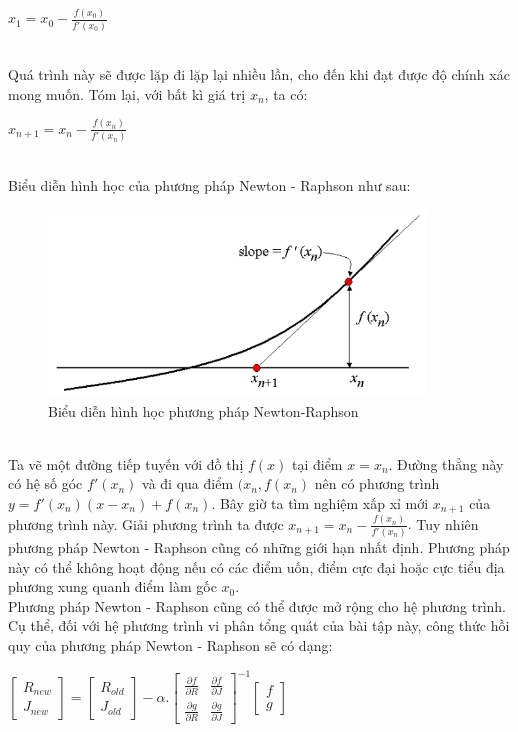 \centerline{$x_1 = x_0 - \frac{f(x_0)}{f'(x_0)}$}\\
\hspace*{0.5cm} {Quá trình này sẽ được lặp đi lặp lại nhiều lần, cho đến khi đạt được độ chính xác mong muốn. Tóm lại, với bất kì giá trị $x_n$, ta có:}\\
\centerline{$x_{n+1} = x_n - \frac{f(x_n)}{f'(x_n)}$}\\
\hspace*{0.5cm} {Biểu diễn hình học của phương pháp Newton - Raphson như sau:}
\begin{figure}[h!]
        \begin{center}
        \includegraphics[width=10cm]{images/Newton_Geo.png}
        \end{center}
        \caption{Biểu diễn hình học phương pháp Newton-Raphson}
\end{figure}\\
\hspace*{0.5cm} {Ta vẽ một đường tiếp tuyến với đồ thị $f(x)$ tại điểm $x=x_n$. Đường thẳng này có hệ số góc $f'(x_n)$ và đi qua điểm $(x_n, f(x_n)$ nên có phương trình $y = f'(x_n)(x - x_n) + f(x_n)$. Bây giờ ta tìm nghiệm xấp xỉ mới $x_{n+1}$ của phương trình này. Giải phương trình ta được $x_{n+1} = x_n - \frac{f(x_n)}{f'(x_n)}$}.
\hspace*{0.5cm} {Tuy nhiên phương pháp Newton - Raphson cũng có những giới hạn nhất định. Phương pháp này có thể không hoạt động nếu có các điểm uốn, điểm cực đại hoặc cực tiểu địa phương xung quanh điểm làm gốc $x_0$.}\\
\hspace*{0.5cm} {Phương pháp Newton - Raphson cũng có thể được mở rộng cho hệ phương trình. Cụ thể, đối với hệ phương trình vi phân tổng quát của bài tập này, công thức hồi quy của phương pháp Newton - Raphson sẽ có dạng:}\\
\centerline{$\begin{bmatrix}
    R_{new} \\
    J_{new}
\end{bmatrix} = \begin{bmatrix}
    R_{old} \\
    J_{old}
\end{bmatrix} - \alpha.\begin{bmatrix}
    \frac{\partial f}{\partial R} & \frac{\partial f}{\partial J}\\
    \frac{\partial g}{\partial R} & \frac{\partial g}{\partial J}
\end{bmatrix}^{-1}\begin{bmatrix}
    f \\
    g
\end{bmatrix}$}\\
